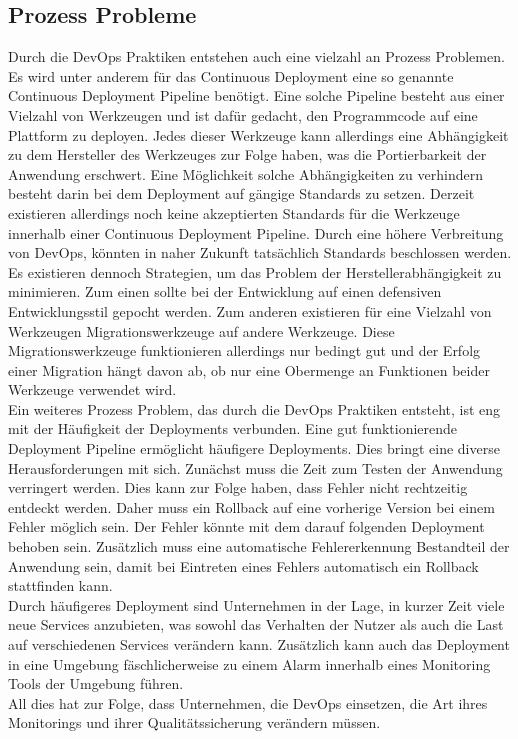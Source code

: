 \subsection{Prozess Probleme}
Durch die DevOps Praktiken entstehen auch eine vielzahl an Prozess Problemen. Es wird unter anderem für das Continuous Deployment eine so genannte Continuous Deployment Pipeline benötigt. Eine solche Pipeline besteht aus einer Vielzahl von Werkzeugen und ist dafür gedacht, den Programmcode auf eine Plattform zu deployen. Jedes dieser Werkzeuge kann allerdings eine Abhängigkeit zu dem Hersteller des Werkzeuges zur Folge haben, was die Portierbarkeit der Anwendung erschwert. Eine Möglichkeit solche Abhängigkeiten zu verhindern besteht darin bei dem Deployment auf gängige Standards zu setzen. Derzeit existieren allerdings noch keine akzeptierten Standards für die Werkzeuge innerhalb einer Continuous Deployment Pipeline. Durch eine höhere Verbreitung von DevOps, könnten in naher Zukunft tatsächlich Standards beschlossen werden. \\
Es existieren dennoch Strategien, um das Problem der Herstellerabhängigkeit zu minimieren. Zum einen sollte bei der Entwicklung auf einen defensiven Entwicklungsstil gepocht werden. Zum anderen existieren für eine Vielzahl von Werkzeugen Migrationswerkzeuge auf andere Werkzeuge. Diese Migrationswerkzeuge funktionieren allerdings nur bedingt gut und der Erfolg einer Migration hängt davon ab, ob nur eine Obermenge an Funktionen beider Werkzeuge verwendet wird. \\
Ein weiteres Prozess Problem, das durch die DevOps Praktiken entsteht, ist eng mit der Häufigkeit der Deployments verbunden. Eine gut funktionierende Deployment Pipeline ermöglicht häufigere Deployments. Dies bringt eine diverse Herausforderungen mit sich. Zunächst muss die Zeit zum Testen der Anwendung verringert werden. Dies kann zur Folge haben, dass Fehler nicht rechtzeitig entdeckt werden. Daher muss ein Rollback auf eine vorherige Version bei einem Fehler möglich sein. Der Fehler könnte mit dem darauf folgenden Deployment behoben sein. Zusätzlich muss eine automatische Fehlererkennung Bestandteil der Anwendung sein, damit bei Eintreten eines Fehlers automatisch ein Rollback stattfinden kann. \\
Durch häufigeres Deployment sind Unternehmen in der Lage, in kurzer Zeit viele neue Services anzubieten, was sowohl das Verhalten der Nutzer als auch die Last auf verschiedenen Services verändern kann. Zusätzlich kann auch das Deployment in eine Umgebung fäschlicherweise zu einem Alarm innerhalb eines Monitoring Tools der Umgebung führen. \\
All dies hat zur Folge, dass Unternehmen, die DevOps einsetzen, die Art ihres Monitorings und ihrer Qualitätssicherung verändern müssen.

